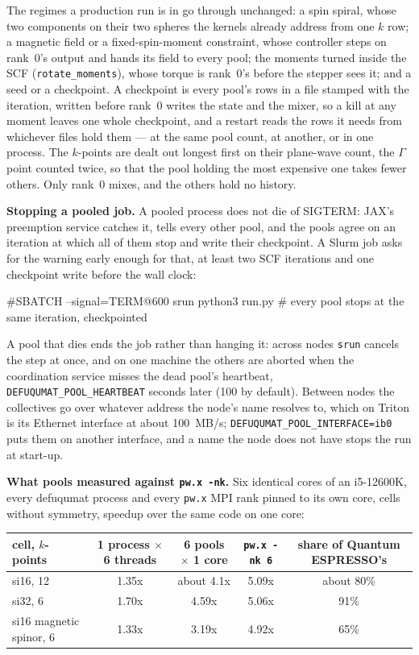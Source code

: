 \documentclass[11pt,a4paper]{article}
\newcommand{\qe}{Quantum ESPRESSO}
\newcommand{\code}[1]{\texttt{\small #1}}
\begin{document}
The regimes a production run is in go through unchanged: a spin spiral, whose
two components on their two spheres the kernels already address from one $k$
row; a magnetic field or a fixed-spin-moment constraint, whose controller steps
on rank~0's output and hands its field to every pool; the moments turned inside
the SCF (\code{rotate\_moments}), whose torque is rank~0's before the stepper
sees it; and a seed or a checkpoint. A checkpoint is every pool's rows in a file
stamped with the iteration, written before rank~0 writes the state and the
mixer, so a kill at any moment leaves one whole checkpoint, and a restart reads
the rows it needs from whichever files hold them --- at the same pool count, at
another, or in one process. The $k$-points are dealt out longest first on their
plane-wave count, the $\Gamma$ point counted twice, so that the pool holding the
most expensive one takes fewer others. Only rank~0 mixes, and the others hold no
history.

\textbf{Stopping a pooled job.} A pooled process does not die of SIGTERM: JAX's
preemption service catches it, tells every other pool, and the pools agree on an
iteration at which all of them stop and write their checkpoint. A Slurm job asks
for the warning early enough for that, at least two SCF iterations and one
checkpoint write before the wall clock:

\begin{shcode}
#SBATCH --signal=TERM@600
srun python3 run.py            # every pool stops at the same iteration, checkpointed
\end{shcode}

\noindent A pool that dies ends the job rather than hanging it: across nodes
\code{srun} cancels the step at once, and on one machine the others are aborted
when the coordination service misses the dead pool's heartbeat,
\code{DEFUQUMAT\_POOL\_HEARTBEAT} seconds later (100 by default). Between nodes the
collectives go over whatever address the node's name resolves to, which on
Triton is its Ethernet interface at about 100~MB/s;
\code{DEFUQUMAT\_POOL\_INTERFACE=ib0} puts them on another interface, and a name the
node does not have stops the run at start-up.

\textbf{What pools measured against \code{pw.x -nk}.} Six identical cores of an
i5-12600K, every defuqumat process and every \code{pw.x} MPI rank pinned to its own
core, cells without symmetry, speedup over the same code on one core:

\begin{center}
\begin{tabular}{lcccc}
\toprule
cell, $k$-points & 1 process $\times$ 6 threads & 6 pools $\times$ 1 core & \code{pw.x -nk 6} & share of \qe's \\
\midrule
si16, 12 & 1.35x & about 4.1x & 5.09x & about 80\% \\
si32, 6 & 1.70x & 4.59x & 5.06x & 91\% \\
si16 magnetic spinor, 6 & 1.33x & 3.19x & 4.92x & 65\% \\
\bottomrule
\end{tabular}
\end{center}
\end{document}
